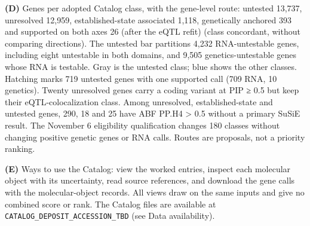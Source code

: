 \textbf{(D)} Genes per adopted Catalog class, with the gene-level route: untested 13,737, unresolved 12,959, established-state associated 1,118, genetically anchored 393 and supported on both axes 26 (after the eQTL refit) (class concordant, without comparing directions). The untested bar partitions 4,232 RNA-untestable genes, including eight untestable in both domains, and 9,505 genetics-untestable genes whose RNA is testable. Gray is the untested class; blue shows the other classes. Hatching marks 719 untested genes with one supported call (709 RNA, 10 genetics). Twenty unresolved genes carry a coding variant at PIP ≥ 0.5 but keep their eQTL-colocalization class. Among unresolved, established-state and untested genes, 290, 18 and 25 have ABF PP.H4 \textgreater{} 0.5 without a primary SuSiE result. The November 6 eligibility qualification changes 180 classes without changing positive genetic genes or RNA calls. Routes are proposals, not a priority ranking.

\textbf{(E)} Ways to use the Catalog: view the worked entries, inspect each molecular object with its uncertainty, read source references, and download the gene calls with the molecular-object records. All views draw on the same inputs and give no combined score or rank. The Catalog files are available at \texttt{CATALOG\_DEPOSIT\_ACCESSION\_TBD} (see Data availability).

